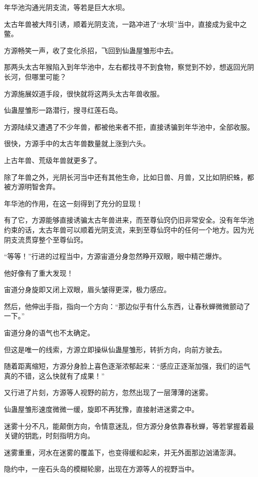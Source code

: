 \begin{this_body}
年华池沟通光阴支流，等若是巨大水坝。

太古年兽被大阵引诱，顺着光阴支流，一路冲进了“水坝”当中，直接成为瓮中之鳖。

方源畅笑一声，收了变化杀招，飞回到仙蛊屋雏形中去。

那两头太古年猴陷入到年华池中，左右都找寻不到食物，察觉到不妙，想返回光阴长河，但哪里可能？

方源施展奴道手段，很快就将这两头太古年兽收服。

仙蛊屋雏形一路潜行，搜寻红莲石岛。

方源陆续又遭遇了不少年兽，都被他来者不拒，直接诱骗到年华池中，全部收服。

很快，方源手中的太古年兽数量就上涨到六头。

上古年兽、荒级年兽就更多了。

除了年兽之外，光阴长河当中还有其他生命，比如日兽、月兽，又比如阴织蛛，都被方源明智舍弃。

年华池的作用，在这一刻得到了充分的显现！

有了它，方源能够直接诱骗太古年兽进来，而至尊仙窍仍旧非常安全。没有年华池约束的话，太古年兽可以顺着光阴支流，来到至尊仙窍中的任何一个地方。因为光阴支流贯穿整个至尊仙窍。

“等等！”行进的过程当中，方源宙道分身忽然睁开双眼，眼中精芒爆炸。

他好像有了重大发现！

宙道分身旋即又闭上双眼，眉头皱得更深，极力感应。

然后，他伸出手指，指向一个方向：“那边似乎有什么东西，让春秋蝉微微颤动了一下。”

宙道分身的语气也不太确定。

但这是唯一的线索，方源立即操纵仙蛊屋雏形，转折方向，向前方驶去。

随着距离缩短，方源分身脸上喜色逐渐浓郁起来：“感应正逐渐加强，我们的运气真的不错，这么快就有了成果！”

又行进了片刻，方源等人视野的前方，忽然出现了一层薄薄的迷雾。

仙蛊屋雏形速度微微一缓，旋即不再犹豫，直接射进迷雾之中。

迷雾十分不凡，能颠倒方向，令情意迷乱，但方源分身依靠春秋蝉，等若掌握着最关键的钥匙，时刻指明方向。

迷雾重重，河水在迷雾的覆盖下，也变得缓和起来，并无外面那边汹涌澎湃。

隐约中，一座石头岛的模糊轮廓，出现在方源等人的视野当中。


\end{this_body}
